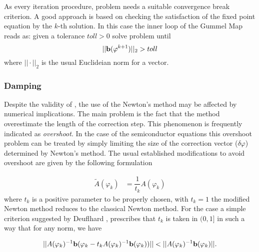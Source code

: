 As every iteration procedure, problem  needs a suitable convergence break criterion. A good approach is based on checking the satisfaction of the fixed point equation  by the $k$-th solution. In this case the inner loop of the Gummel Map reads as: given a tolerance $toll>0$ solve problem  until
\begin{equation}
||\mathbf{b}(\varphi^{k+1})||_2 > toll
\end{equation}
where $||\cdot ||_2$ is the usual Euclideian norm for a vector.

\subsubsection{Damping}

Despite the validity of , the 
use of the Newton's method may be affected by numerical implications.
The main problem is the fact that the method overestimate the length of the correction step. This phenomenon is frequently indicated as \textit{overshoot}. In the case of the semiconductor equations this overshoot problem can be treated by simply limiting the size of the correction vector ($\delta \varphi$) determined by Newton's method. The usual established modifications to avoid overshoot are given by the following formulation


\begin{align}
\tilde{A}(\varphi_k)&=\dfrac{1}{t_k}A(\varphi_k) \label{eq: NLP mod used}
\end{align}
where $t_k$ is a positive parameter to be properly chosen, with $t_k=1$ the modified Newton method reduces to the classical Newton method.
For the case  a simple criterion suggested by Deuflhard \cite{DefulhardDamp}, prescribes that $t_k$ is taken in $(0,1]$ in such a way that for any norm, we have

\begin{equation}
\label{eq: extended criterion}
||A(\varphi_k)^{-1}\vect{b}(\varphi_k-t_kA(\varphi_k)^{-1}\vect{b}(\varphi_k))||<||A(\varphi_k)^{-1}\vect{b}(\varphi_k)||.
\end{equation}

